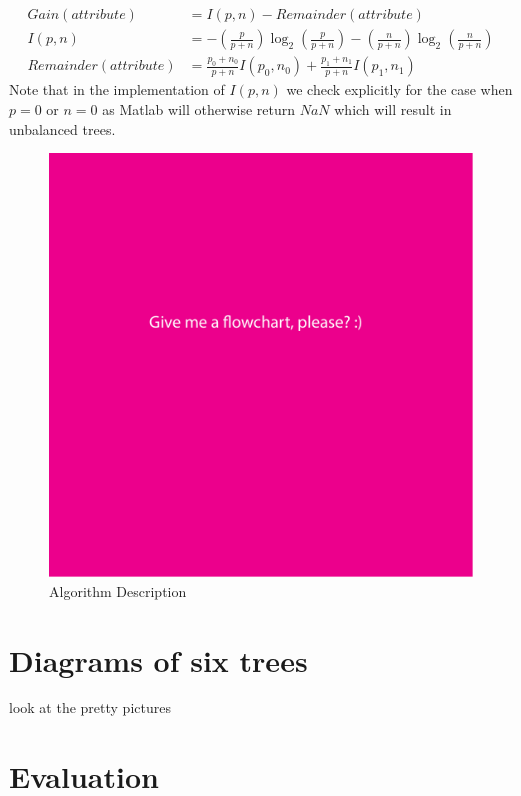 \documentclass[11pt,a4paper]{article}
\begin{document}
\begin{align}
Gain(attribute)  &= I(p,n) - Remainder(attribute)\\
I(p,n) &= -\left(\frac{p}{p+n}\right)\log_2{\left(\frac{p}{p+n}\right)} -\left(\frac{n}{p+n}\right)\log_2{\left(\frac{n}{p+n}\right)}\\
Remainder(attribute) &= \frac{p_0 + n_0}{p+n}I(p_0,n_0) + \frac{p_1 + n_1}{p + n}I(p_1,n_1)
\end{align}
Note that in the implementation of $I(p,n)$ we check explicitly for the case when $p = 0$ or $n = 0$ as Matlab will otherwise return $NaN$ which will result in unbalanced trees.

\begin{figure}[!ht]
\centering
\includegraphics[scale=0.7]{images/flowchart.pdf}
\caption{Algorithm Description}
\label{fig:flowchart}
\end{figure}

\section{Diagrams of six trees}

look at the pretty pictures

\section{Evaluation}
\end{document}
